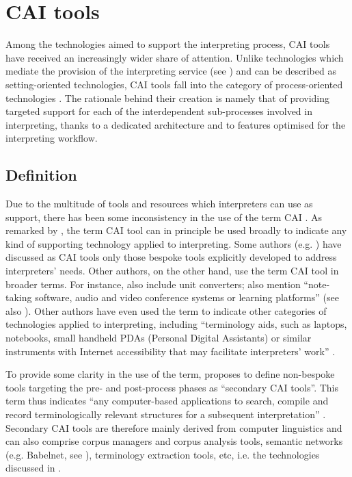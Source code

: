 \section{CAI tools} \label{CAItools}
\begin{sloppypar}
Among the technologies aimed to support the interpreting process, CAI tools have received an increasingly wider share of attention. Unlike technologies which mediate the provision of the interpreting service (see ) and can be described as setting-oriented technologies, CAI tools fall into the category of pro\-cess-ori\-ent\-ed technologies \citep{fantinuoli_computer-assisted_2018}. The rationale behind their creation is namely that of providing targeted support for each of the interdependent sub-processes involved in interpreting, thanks to a dedicated architecture and to features optimised for the interpreting workflow.
\end{sloppypar}
\subsection{Definition} \label{CAIdef}
Due to the multitude of tools and resources which interpreters can use as support, there has been some inconsistency in the use of the term CAI \citep[46]{will2020computer}. As remarked by \citet{will2020computer}, the term CAI tool can in principle be used broadly to indicate any kind of supporting technology applied to interpreting. Some authors (e.g. \citealt{fantinuoli_computer-assisted_2018,prandi_designing_2017,prandi_exploratory_2018}) have discussed as CAI tools only those bespoke tools explicitly developed to address interpreters' needs. Other authors, on the other hand, use the term CAI tool in broader terms. For instance, \citet{costa_technology-assisted_2014} also include unit converters; \citet{ortiz_computer-assisted_2018} also mention ``note-taking software, audio and video conference systems or learning platforms'' (see also \citealt[47]{will2020computer}). Other authors have even used the term to indicate other categories of technologies applied to interpreting, including ``terminology aids, such as laptops, notebooks, small handheld PDAs (Personal Digital Assistants) or similar instruments with Internet accessibility that may facilitate interpreters' work'' \citep[90]{tripepi_winteringham_usefulness_2010}.

To provide some clarity in the use of the term, \citet[47]{will2020computer} proposes to define non-bespoke tools targeting the pre- and post-process phases as ``secondary CAI tools''. This term thus indicates ``any computer-based applications to search, compile and record terminologically relevant structures for a subsequent interpretation'' \citep[47]{will2020computer}. Secondary CAI tools are therefore mainly derived from computer linguistics and can also comprise corpus managers and corpus analysis tools, semantic networks (e.g. Babelnet, see \citealt{navigliBabelNetAutomaticConstruction2012,navigliTenYearsBabelNet2021}), terminology extraction tools, etc, i.e. the technologies discussed in .

